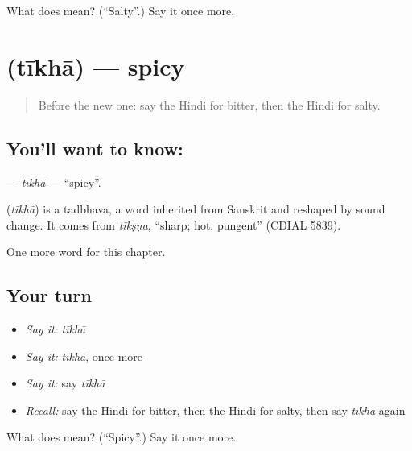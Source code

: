 \begin{tcolorbox}[breakable,colback=teal!4,colframe=teal!35!black,title={Before you move on}]
What does  mean? (\textquotedblleft{}Salty\textquotedblright{}.) Say it once more.
\end{tcolorbox}
\section[\texorpdfstring{\hi{तीखा} (tīkhā)}{तीखा (tīkhā)}]{ (tīkhā) — spicy}

\label{lesson:HI-C156-tikha}



\begin{quote}
Before the new one: say the Hindi for bitter, then the Hindi for salty.
\end{quote}

\subsection*{You'll want to know: }
\textbf{} — \emph{tīkhā} — \textquotedblleft{}spicy\textquotedblright{}.

\begin{cousinweb}
\textbf{} (\emph{tīkhā}) is a tadbhava, a word inherited from Sanskrit and reshaped by sound change. It comes from \emph{tīkṣṇa}, \textquotedblleft{}sharp; hot, pungent\textquotedblright{} (CDIAL 5839).
\end{cousinweb}

\begin{grammarlens}[title={What you've built}]
One more word for this chapter.
\end{grammarlens}

\subsection*{Your turn}
\begin{itemize}
\raggedright
  \item \emph{Say it:} \emph{tīkhā}
  \item \emph{Say it:} \emph{tīkhā}, once more
  \item \emph{Say it:} say \emph{tīkhā}
  \item \emph{Recall:} say the Hindi for bitter, then the Hindi for salty, then say \emph{tīkhā} again
\end{itemize}

\begin{tcolorbox}[breakable,colback=teal!4,colframe=teal!35!black,title={Before you move on}]
What does  mean? (\textquotedblleft{}Spicy\textquotedblright{}.) Say it once more.
\end{tcolorbox}
